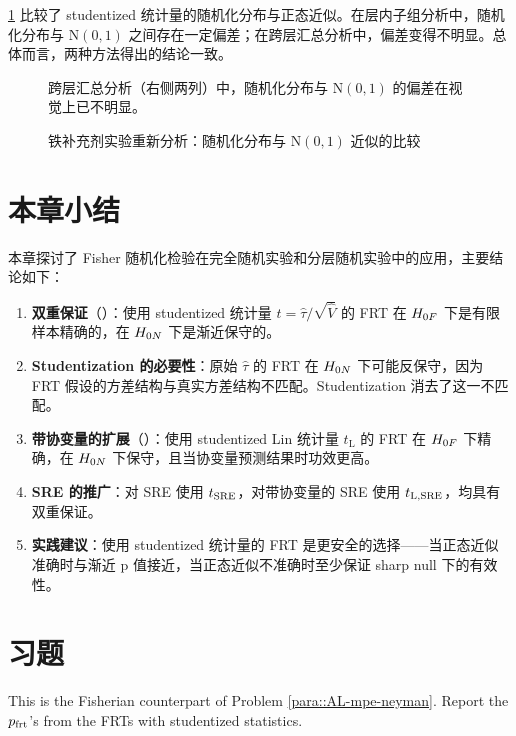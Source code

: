 \cref{fig:8-randomization-dist} 比较了 studentized 统计量的随机化分布与正态近似。在层内子组分析中，随机化分布与 $\mathrm{N}(0,1)$ 之间存在一定偏差；在跨层汇总分析中，偏差变得不明显。总体而言，两种方法得出的结论一致。

\begin{figure}[htbp]
\centering
\caption{铁补充剂实验重新分析：随机化分布与 $\mathrm{N}(0,1)$ 近似的比较}
\label{fig:8-randomization-dist}
\par\medskip\small
跨层汇总分析（右侧两列）中，随机化分布与 $\mathrm{N}(0,1)$ 的偏差在视觉上已不明显。
\end{figure}

\section{本章小结}
\label{sec:8-summary}

本章探讨了 Fisher 随机化检验在完全随机实验和分层随机实验中的应用，主要结论如下：

\begin{enumerate}
  \item \textbf{双重保证}（\citet{DingDasgupta:2017}）：使用 studentized 统计量 $t = \hat\tau / \sqrt{\hat V}$ 的 FRT 在 $H_{0F}$ 下是有限样本精确的，在 $H_{0N}$ 下是渐近保守的。
  \item \textbf{Studentization 的必要性}：原始 $\hat\tau$ 的 FRT 在 $H_{0N}$ 下可能反保守，因为 FRT 假设的方差结构与真实方差结构不匹配。Studentization 消去了这一不匹配。
  \item \textbf{带协变量的扩展}（\citet{ZhaoDing:2021a}）：使用 studentized Lin 统计量 $t_\mathrm{L}$ 的 FRT 在 $H_{0F}$ 下精确，在 $H_{0N}$ 下保守，且当协变量预测结果时功效更高。
  \item \textbf{SRE 的推广}：对 SRE 使用 $t_{\text{SRE}}$，对带协变量的 SRE 使用 $t_{\mathrm{L},\text{SRE}}$，均具有双重保证。
  \item \textbf{实践建议}：使用 studentized 统计量的 FRT 是更安全的选择——当正态近似准确时与渐近 p 值接近，当正态近似不准确时至少保证 sharp null 下的有效性。
\end{enumerate}

\section{习题}\label{sec:8-homework}

\begin{HomeworkProblem}\label{exr:8-1}

This is the Fisherian counterpart of Problem \ref{para::AL-mpe-neyman}.
Report the $p_{\text{frt}}$'s from the FRTs with studentized statistics.


\end{HomeworkProblem}

